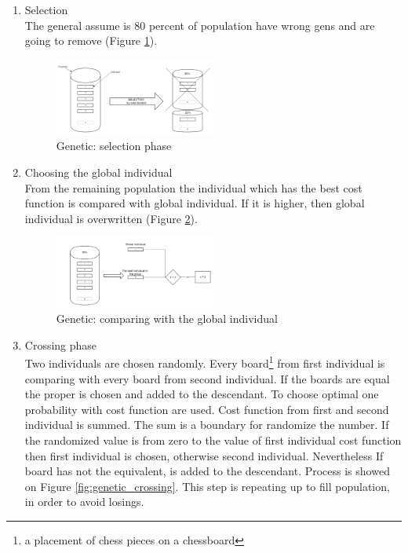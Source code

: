 \documentclass[pdftex]{article}
\begin{document}
\begin{enumerate}
 	\item Selection \hfill \\
		The general assume is 80 percent of population have wrong gens and are going to remove (Figure \ref{fig:genetic_selection}).
		
\begin{figure}[!htb]
	\centering
	\includegraphics[width=0.5\textwidth]{genetic/genetic_selection.png} 
	\caption{Genetic: selection phase}
	\label{fig:genetic_selection}
\end{figure}

	\item Choosing the global individual \hfill \\
		From the remaining population the individual which has the best cost function is compared with global individual. If it is higher, then global individual is overwritten (Figure \ref{fig:genetic_global}).

\begin{figure}[!htb]
	\centering
	\includegraphics[width=0.5\textwidth]{genetic/genetic_global.png} 
	\caption{Genetic: comparing with the global individual}
	\label{fig:genetic_global}
\end{figure}

	\item Crossing phase \hfill \\
		Two individuals are chosen randomly. Every board\footnote{a placement of chess pieces on a chessboard} from first individual is comparing with every board from second individual. If the boards are equal the proper is chosen and added to the descendant. To choose optimal one probability with cost function are used. Cost function from first and second individual is summed. The sum is a boundary for randomize the number. If the randomized value is from zero to the value of first individual cost function then first individual is chosen, otherwise second individual. Nevertheless If board has not the equivalent, is added to the descendant. Process is showed on Figure \ref{fig:genetic_crossing}. This step is repeating up to fill population, in order to avoid losings.

\end{enumerate}
\end{document}

